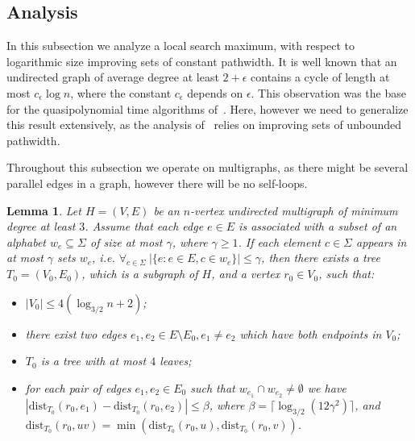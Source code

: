 \documentclass[11pt]{article}
\newtheorem{lemma}[theorem]{Lemma}
\theoremstyle{definition}
\newcommand{\dist}{\mathrm{dist}}
\begin{document}
\subsection{Analysis}
\label{ssec:analysis}

In this subsection we analyze a local search maximum, with respect
to logarithmic size improving sets of constant pathwidth.
It is well known that an undirected graph of average degree
at least $2+\epsilon$ contains a cycle of length at most $c_\epsilon \log n$,
   where the constant $c_{\epsilon}$ depends on $\epsilon$.
This observation was the base for the quasipolynomial time algorithms of~\cite{h95,cgm13}.
Here, however we need to generalize this result extensively,
as the analysis of~\cite{cgm13} relies on improving sets of unbounded pathwidth.

Throughout this subsection we operate on multigraphs, as there might be several
parallel edges in a graph, however there will be no self-loops.

\begin{lemma}
\label{lem:improving-tree}
Let $H=(V,E)$ be an $n$-vertex undirected multigraph of minimum degree at least $3$.
Assume that each edge $e \in E$ is associated with a subset of an alphabet $w_e \subseteq \Sigma$ of size at most $\gamma$, where $\gamma \ge 1$.
If each element $c \in \Sigma$ appears in at most $\gamma$ sets $w_e$, i.e. $\forall_{c\in \Sigma}~|\{e : e \in E, c \in w_e\}| \le \gamma$, then
there exists a tree $T_0 = (V_0, E_0)$, which is a subgraph of $H$, and a vertex $r_0 \in V_0$, such that:
\begin{itemize}
  \item $|V_0| \le 4(\log_{3/2} n + 2)$;
  \item there exist two edges $e_1, e_2 \in E \setminus E_0, e_1 \neq e_2$ which have both endpoints in $V_0$;
  \item $T_0$ is a tree with at most $4$ leaves; 
  \item for each pair of edges $e_1,e_2 \in E_0$ such that $w_{e_1} \cap w_{e_2} \neq \emptyset$
  we have $|\dist_{T_0}(r_0,e_1) - \dist_{T_0}(r_0,e_2)| \le \beta$, where $\beta = \lceil \log_{3/2} (12\gamma^2) \rceil$,
  and $\dist_{T_0}(r_0,uv) = \min(\dist_{T_0}(r_0,u), \dist_{T_0}(r_0,v))$.
\end{itemize}
\end{lemma}
\end{document}
